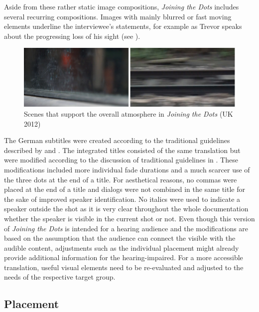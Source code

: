 \documentclass[output=paper]{langsci/langscibook}
\begin{document}
Aside from these rather static image compositions, \textit{Joining the Dots} includes several recurring compositions. Images with mainly blurred or fast moving elements underline the interviewee's statements, for example as Trevor speaks about the progressing loss of his sight (see ).

\begin{figure}[t]
 \includegraphics[width=\textwidth]{figures/Fox4.png}
 \caption{Scenes that support the overall atmosphere in \textit{Joining the Dots} (UK 2012)}
 \label{fox:fig:4}
\end{figure} 

The German subtitles were created according to the traditional guidelines described by \citet{ivarsson1998} and \citet{karamitroglou1998}. The integrated titles consisted of the same translation but were modified according to the discussion of traditional guidelines in \citet{fox2012}. These modifications included more individual fade durations and a much scarcer use of the three dots at the end of a title. For aesthetical reasons, no commas were placed at the end of a title and dialogs were not combined in the same title for the sake of improved speaker identification. No italics were used to indicate a speaker outside the shot as it is very clear throughout the whole documentation whether the speaker is visible in the current shot or not. Even though this version of \textit{Joining the Dots} is intended for a hearing audience and the modifications are based on the assumption that the audience can connect the visible with the audible content, adjustments such as the individual placement might already provide additional information for the hearing-impaired. For a more accessible translation, useful visual elements need to be re-evaluated and adjusted to the needs of the respective target group.

\subsection{Placement}
\end{document}
